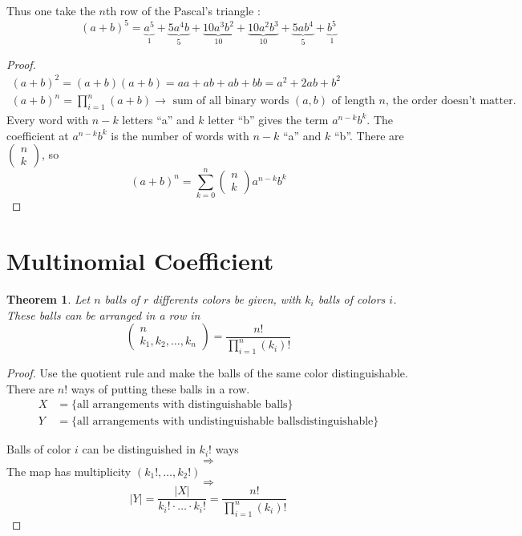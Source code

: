\documentclass[a4paper,11pt]{report}
\newtheorem{theorem}{Theorem}
\begin{document}
Thus one take the $n$th row of the Pascal's triangle :
\[
  (a+b)^5 = \underbrace{a^5}_1 + \underbrace{5a^4b}_5 +
  \underbrace{10a^3b^2}_{10} + \underbrace{10a^2b^3}_{10} + \underbrace{5ab^4}_5 + \underbrace{b^5}_1
\]

\begin{proof}
  \begin{gather*}
    (a+b)^2 = (a+b)(a+b) = aa + ab + ab + bb = a^2 + 2ab + b^2 \\
    (a+b)^n = \prod_{i=1}^{n} (a+b) \rightarrow \text{ sum of all binary words
      $(a,b)$ of length $n$, the order doesn't matter.}
  \end{gather*}
  Every word with $n-k$ letters ``a'' and $k$ letter ``b'' gives the term
  $a^{n-k}b^k$. The coefficient at $a^{n-k}b^k$ is the number of words with
  $n-k$ ``a'' and $k$ ``b''. There are $\begin{pmatrix} n \\ k\end{pmatrix}$,
  so
  \[
    (a+b)^n = \sum_{k=0}^{n} \begin{pmatrix} n \\ k\end{pmatrix} a^{n-k}b^k
  \]
\end{proof}

\section{Multinomial Coefficient}

\begin{theorem}
  Let $n$ balls of $r$ differents colors be given, with $k_i$ balls of colors
  $i$. These balls can be arranged in a row in
  \[
    \begin{pmatrix} n \\ k_1,k_2,\dots,k_n\end{pmatrix} = \frac{n!}{\prod_{i=1}^n(k_i)!}
  \]
\end{theorem}

\begin{proof}
  Use the quotient rule and make the balls of the same color distinguishable.
  There are $n!$ ways of putting these balls in a row.
  \begin{align*}
    X &= \{\text{all arrangements with distinguishable balls}\} \\
    Y &= \{\text{all arrangements with undistinguishable ballsdistinguishable}\}
  \end{align*}

  Balls of color $i$ can be distinguished in $k_i!$ ways
  $$ \Rightarrow $$
  The map has multiplicity $(k_1!,\dots,k_2!)$
  $$ \Rightarrow $$
  \[
    |Y| = \frac{|X|}{k_i! \cdot \dots \cdot k_i!} = \frac{n!}{\prod_{i=1}^n (k_i)!}
  \]
\end{proof}
\end{document}
